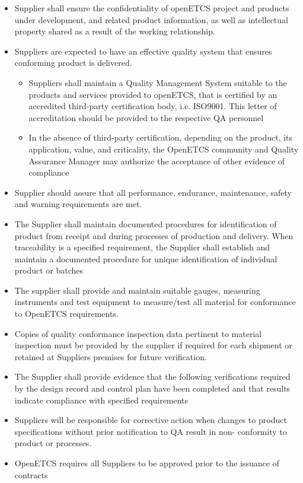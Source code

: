 \documentclass{template/openetcs_article}
\begin{document}
\begin{itemize}
\item Supplier shall ensure the confidentiality of openETCS project and products under development, and related product information, as well as intellectual property shared as a result of the working relationship.
\item Suppliers are expected to have an effective quality system that ensures conforming product is delivered.
\begin{itemize}
\item Suppliers shall maintain a Quality Management System suitable to the products and services provided to openETCS, that is certified by an accredited third-party certification body, i.e. ISO9001. This letter of accreditation should be provided to the respective QA personnel
\item In the absence of third-party certification, depending on the product, its application, value, and criticality, the OpenETCS community and Quality Assurance Manager may authorize the acceptance of other evidence of compliance
\end{itemize}
\item Supplier should assure that all performance, endurance, maintenance, safety and warning requirements are met.
\item The Supplier shall maintain documented procedures for identification of product from receipt and during processes of production and delivery. When traceability is a specified requirement, the Supplier shall establish and maintain a documented procedure for unique identification of individual product or batches
\item The supplier shall provide and maintain suitable gauges, measuring instruments and test equipment to measure/test all material for conformance to OpenETCS requirements.
\item Copies of quality conformance inspection data pertinent to material inspection must be provided by the supplier if required for each shipment or retained at Suppliers premises for future verification.
\item The Supplier shall provide evidence that the following verifications required by the design record and control plan have been completed and that results indicate compliance with specified requirements
\item Suppliers will be responsible for corrective action when changes to product specifications without prior notification to QA result in non- conformity to product or processes.
\item OpenETCS requires all Suppliers to be approved prior to the issuance of contracts
\end{itemize}
\end{document}
